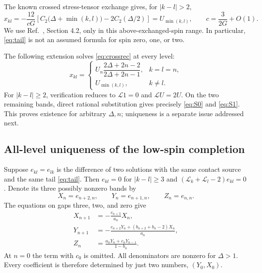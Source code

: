 \documentclass[11pt,a4paper]{article}
\numberwithin{equation}{section}
\theoremstyle{remark}\newtheorem{remark}[theorem]{Remark}
\begin{document}
The known crossed stress-tensor exchange gives, for $|k-l|>2$,
\begin{equation}
 x_{kl}=-\frac{12}{cG}\left[
 C_2\bigl(\Delta+\min(k,l)\bigr)-2C_2(\Delta/2)\right]
 =U_{\min(k,l)},\qquad c=\frac3{2G}+O(1).
 \label{eq:tail}
\end{equation}
We use Ref.~\cite{KSS}, Section 4.2, only in this above-exchanged-spin range. In particular, \eqref{eq:tail} is not an assumed formula for spin zero, one, or two.

The following extension solves \eqref{eq:crossrec} at every level:
\begin{equation}
 x_{kl}=
 \begin{cases}
 U_n\dfrac{2\Delta+2n-2}{2\Delta+2n-1},&k=l=n,\\[6pt]
 U_{\min(k,l)},&k\ne l.
 \end{cases}
 \label{eq:xsolution}
\end{equation}
For $|k-l|\geq2$, verification reduces to $\mathcal L1=0$ and $\mathcal LU=2U$. On the two remaining bands, direct rational substitution gives precisely \eqref{eq:S0} and \eqref{eq:S1}. This proves existence for arbitrary $\Delta,n$; uniqueness is a separate issue addressed next.

\subsection{All-level uniqueness of the low-spin completion}
\label{sec:uniqueness}

Suppose $e_{kl}=e_{lk}$ is the difference of two solutions with the same contact source and the same tail \eqref{eq:tail}. Then $e_{kl}=0$ for $|k-l|\geq3$ and
$(\mathcal L_k+\mathcal L_l-2)e_{kl}=0$. Denote its three possibly nonzero bands by
\begin{equation}
 X_n=e_{n+2,n},\qquad Y_n=e_{n+1,n},\qquad Z_n=e_{n,n}.
\end{equation}
The equations on gaps three, two, and zero give
\begin{align}
 X_{n+1}&=-\frac{c_{n+3}}{a_n}X_n,\label{eq:uniqueX}\\
 Y_{n+1}&=-\frac{c_{n+2}Y_n+(b_{n+2}+b_n-2)X_n}{a_n},\label{eq:uniqueY}\\
 Z_n&=\frac{a_nY_n+c_nY_{n-1}}{1-b_n}.\label{eq:uniqueZ}
\end{align}
At $n=0$ the term with $c_0$ is omitted. All denominators are nonzero for $\Delta>1$. Every coefficient is therefore determined by just two numbers, $(Y_0,X_0)$.
\end{document}
